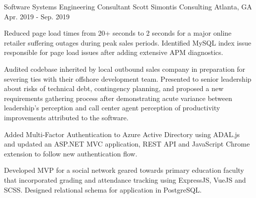 \begin{cventries}
  \cventry
    {Software Systems Engineering Consultant} %
    {Scott Simontis Consulting} %
    {Atlanta, GA} %
    {Apr. 2019 - Sep. 2019} %
    {
      \begin{cvitems} %
        \item {Reduced page load times from 20+ seconds to 2 seconds for a major online retailer suffering outages during peak sales periods. Identified MySQL index issue responsible for page load issues after adding extensive APM diagnostics.}
        \item {Audited codebase inherited by local outbound sales company in preparation for severing ties with their offshore development team. Presented to senior leadership about risks of technical debt, contingency planning, and proposed a new requirements gathering process after demonstrating acute variance between leadership's perception and call center agent perception of productivity improvements attributed to the software.}
        \item {Added Multi-Factor Authentication to Azure Active Directory using ADAL.js and updated an ASP.NET MVC application, REST API and JavaScript Chrome extension to follow new authentication flow.}
        \item {Developed MVP for a social network geared towards primary education faculty that incorporated grading and attendance tracking using ExpressJS, VueJS and SCSS. Designed relational schema for application in PostgreSQL.}
      \end{cvitems}
    }


\end{cventries}
